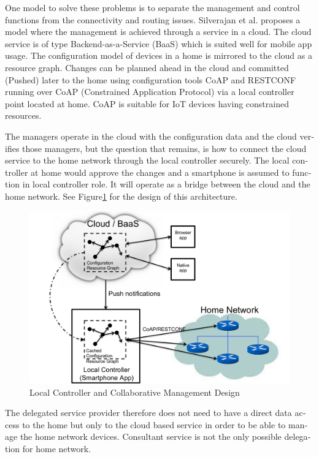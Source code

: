 \documentclass[12pt,a4paper,english]{tutthesis}
\begin{document}
\begin{otherlanguage}{english}
One model to solve these problems is to separate the management and
control functions from the connectivity and routing
issues. Silverajan et al.\cite{silverajan2015collaborative} proposes
a model where the management is achieved through a service in a cloud.
The cloud service is of type Backend-as-a-Service (BaaS) which is suited
well for mobile app usage. The
configuration model of devices in a home is mirrored to the cloud as a
resource graph.
Changes can be planned ahead in the cloud
and committed (Pushed) later to the home  using configuration 
tools CoAP and RESTCONF running over CoAP (Constrained Application
Protocol)
via a local controller point located at home.
CoAP is suitable for IoT devices having constrained resources.

The managers operate in the cloud with the configuration data and the
cloud verifies those managers,
but the question that remains, is how to connect the cloud service to the home network
through the local controller securely. The local controller at home
would approve the changes and a smartphone is assumed to function in
local controller role. It will operate as a bridge between the cloud and the home network.
See Figure\ref{fig:localcontroller} for the design of this architecture.

\begin{figure}[htb]
\centering
\includegraphics[width=.9\linewidth]{localcontroller.png}
\caption{\label{fig:localcontroller}Local Controller and Collaborative Management Design}
\end{figure}



The delegated service provider therefore does not need to have a direct data
access to the home but only to the cloud based service in order to be able to
manage the home network devices.
Consultant service is not the only possible delegation for home network.









\end{otherlanguage}
\end{document}
